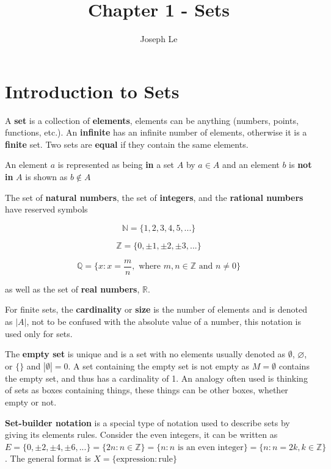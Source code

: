 \documentclass[10pt]{article}
\newcommand{\Z}{\mathbb{Z}}
\theoremstyle{definition}
\begin{document}

\title{Chapter 1 - Sets}
\author{Joseph Le}

\maketitle

\section{Introduction to Sets}

A \textbf{set} is a collection of \textbf{elements}, elements can be anything (numbers, points, functions, etc.). An \textbf{infinite} has an infinite number of elements, otherwise it is a \textbf{finite} set. Two sets are \textbf{equal} if they contain the same elements.

An element $a$ is represented as being \textbf{in} a set $A$ by $a \in A$ and an element $b$ is \textbf{not in} $A$ is shown as $b \notin A$

The set of \textbf{natural numbers}, the set of \textbf{integers}, and the \textbf{rational numbers} have reserved symbols

$$ \mathbb N = \{ 1,2,3,4,5,...\} $$

$$ \mathbb Z = \{ 0, \pm 1, \pm 2, \pm 3, ... \} $$

$$ \mathbb Q = \{ x : x = \frac{m}{n}, \text{ where } m,n \in \Z \text{ and } n \neq 0 \} $$

\noindent as well as the set of \textbf{real numbers}, $\mathbb R$.

For finite sets, the \textbf{cardinality} or \textbf{size} is the number of elements and is denoted as $|A|$, not to be confused with the absolute value of a number, this notation is used only for sets.

The \textbf{empty set} is unique and is a set with no elements usually denoted as $\emptyset$, $\varnothing$, or $\{\}$ and $|\emptyset| = 0$. A set containing the empty set is not empty as $M = {\emptyset}$ contains the empty set, and thus has a cardinality of 1. An analogy often used is thinking of sets as boxes containing things, these things can be other boxes, whether empty or not.

\textbf{Set-builder notation} is a special type of notation used to describe sets by giving its elements rules. Consider the even integers, it can be written as $E = \{0, \pm 2, \pm 4, \pm 6,...\} = \{2n: n \in \mathbb Z\} = \{ n : n \text{ is an even integer} \}= \{ n : n = 2k, k \in \Z \}$. The general format is $X = \{ \text{expression} : \text{rule} \}$
\end{document}
